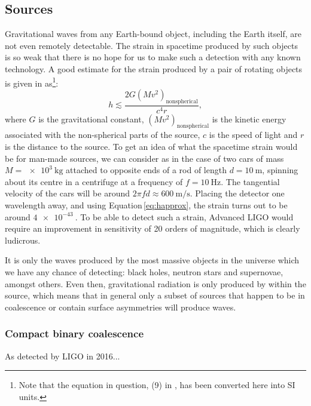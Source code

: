 
\subsection{Sources}
Gravitational waves from any Earth-bound object, including the Earth itself, are not even remotely detectable. The strain in spacetime produced by such objects is so weak that there is no hope for us to make such a detection with any known technology. A good estimate for the strain produced by a pair of rotating objects is given in \cite{Sathyaprakash2009} as\footnote{Note that the equation in question, (9) in \cite{Sathyaprakash2009}, has been converted here into SI units.}:
\begin{equation}
  \label{eq:happrox}
  h \lesssim \frac{2 G \left( M v^{2} \right)_{\text{nonspherical}}}{c^4 r},
\end{equation}
where $G$ is the gravitational constant, $\left( M v^{2} \right)_{\text{nonspherical}}$ is the kinetic energy associated with the non-spherical parts of the source, $c$ is the speed of light and $r$ is the distance to the source. To get an idea of what the spacetime strain would be for man-made sources, we can consider as in \cite{Sathyaprakash2009} the case of two cars of mass $M = \SI{e3}{\kilo\gram}$ attached to opposite ends of a rod of length $d = \SI{10}{\meter}$, spinning about its centre in a centrifuge at a frequency of $f = \SI{10}{\hertz}$. The tangential velocity of the cars will be around $2 \pi f d \approx \SI{600}{\meter\per\second}$. Placing the detector one wavelength away, and using Equation\,\ref{eq:happrox}, the strain turns out to be around $\SI{4e-43}{}$. To be able to detect such a strain, Advanced LIGO would require an improvement in sensitivity of \SI{20}{} orders of magnitude, which is clearly ludicrous.

It is only the waves produced by the most massive objects in the universe which we have any chance of detecting: black holes, neutron stars and supernovae, amongst others. Even then, gravitational radiation is only produced by  within the source, which means that in general only a subset of sources that happen to be in coalescence or contain surface asymmetries will produce waves.

\subsubsection{Compact binary coalescence}
As detected by LIGO in 2016...

